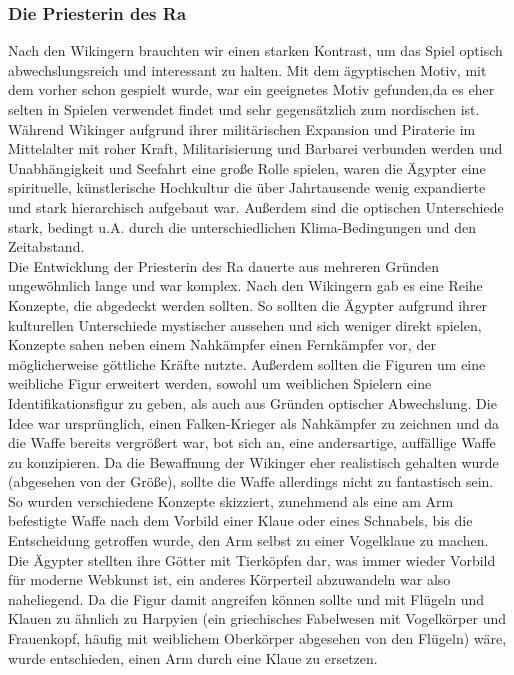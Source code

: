 \documentclass[extern,palatino]{cgBA}
\begin{document}
\subsubsection{Die Priesterin des Ra}
Nach den Wikingern brauchten wir einen starken Kontrast, um das Spiel optisch abwechslungsreich und interessant zu halten. Mit dem ägyptischen Motiv, mit dem vorher schon gespielt wurde, war ein geeignetes Motiv gefunden,da es eher selten in Spielen verwendet findet und sehr gegensätzlich zum nordischen ist. Während Wikinger aufgrund ihrer militärischen Expansion und Piraterie im Mittelalter mit roher Kraft, Militarisierung und Barbarei verbunden werden und Unabhängigkeit und Seefahrt eine große Rolle spielen, waren die Ägypter eine spirituelle, künstlerische Hochkultur die über Jahrtausende wenig expandierte und stark hierarchisch aufgebaut war. Außerdem sind die optischen Unterschiede stark, bedingt u.A. durch die unterschiedlichen Klima-Bedingungen und den Zeitabstand. 
\\Die Entwicklung der Priesterin des Ra dauerte aus mehreren Gründen ungewöhnlich lange und war komplex.
Nach den Wikingern gab es eine Reihe Konzepte, die abgedeckt werden sollten. So sollten die Ägypter aufgrund ihrer kulturellen Unterschiede mystischer aussehen und sich weniger direkt spielen, Konzepte sahen neben einem Nahkämpfer einen Fernkämpfer vor, der möglicherweise göttliche Kräfte nutzte. Außerdem sollten die Figuren um eine weibliche Figur erweitert werden, sowohl um weiblichen Spielern eine Identifikationsfigur zu geben, als auch aus Gründen optischer Abwechslung. Die Idee war ursprünglich, einen Falken-Krieger als Nahkämpfer zu zeichnen und da die Waffe bereits vergrößert war, bot sich an, eine andersartige, auffällige Waffe zu konzipieren. Da die Bewaffnung der Wikinger eher realistisch gehalten wurde (abgesehen von der Größe), sollte die Waffe allerdings nicht zu fantastisch sein. So wurden verschiedene Konzepte skizziert, zunehmend als eine am Arm befestigte Waffe nach dem Vorbild einer Klaue oder eines Schnabels, bis die Entscheidung getroffen wurde, den Arm selbst zu einer Vogelklaue zu machen. Die Ägypter stellten ihre Götter mit Tierköpfen dar, was immer wieder Vorbild für moderne Webkunst ist, ein anderes Körperteil abzuwandeln war also naheliegend. Da die Figur damit angreifen können sollte und mit Flügeln und Klauen zu ähnlich zu Harpyien (ein griechisches Fabelwesen mit Vogelkörper und Frauenkopf, häufig mit weiblichem Oberkörper abgesehen von den Flügeln) wäre, wurde entschieden, einen Arm durch eine Klaue zu ersetzen.
\end{document}
